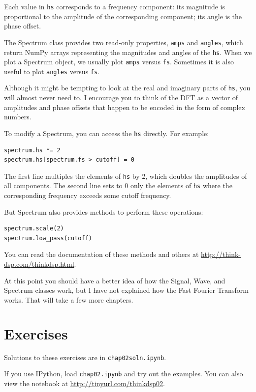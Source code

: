 \documentclass[12pt]{book}
\begin{document}
Each value in {\tt hs} corresponds to a frequency component: its
magnitude is proportional to the amplitude of the corresponding
component; its angle is the phase offset.

The Spectrum class provides two read-only properties, {\tt amps}
and {\tt angles}, which return NumPy arrays representing the
magnitudes and angles of the {\tt hs}.  When we plot a Spectrum
object, we usually plot {\tt amps} versus {\tt fs}.  Sometimes
it is also useful to plot {\tt angles} versus {\tt fs}.

Although it might be tempting to look at the real and imaginary
parts of {\tt hs}, you will almost never need to.  I encourage
you to think of the DFT as a vector of amplitudes and phase offsets
that happen to be encoded in the form of complex numbers.

To modify a Spectrum, you can access the {\tt hs} directly.
For example:

\begin{verbatim}
spectrum.hs *= 2
spectrum.hs[spectrum.fs > cutoff] = 0
\end{verbatim}

The first line multiples the elements of {\tt hs} by 2, which
doubles the amplitudes of all components.  The second line
sets to 0 only the elements of {\tt hs} where the corresponding
frequency exceeds some cutoff frequency.

But Spectrum also provides methods to perform these operations:

\begin{verbatim}
spectrum.scale(2)
spectrum.low_pass(cutoff)
\end{verbatim}

You can read the documentation of these methods and others at
\url{http://think-dsp.com/thinkdsp.html}.

At this point you should have a better idea of how the Signal, Wave,
and Spectrum classes work, but I have not explained how the Fast
Fourier Transform works.  That will take a few more chapters.


\section{Exercises}

Solutions to these exercises are in {\tt chap02soln.ipynb}.

\begin{exercise}
If you use IPython, load {\tt chap02.ipynb} and try out the examples.
You can also view the notebook at \url{http://tinyurl.com/thinkdsp02}.
\end{exercise}
\end{document}
